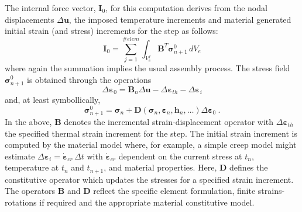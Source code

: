 \documentclass[11pt]{report}
\numberwithin{equation}{section}
\newcommand{\vepsilon}{\varepsilon}
\newcommand{\nid}{\noindent}
\begin{document}
The internal force vector, $\bm{I}_0$, for this computation derives from the 
nodal displacements $\Delta \bm{u}$, the imposed temperature increments and
material generated initial strain (and stress) increments for the step
as follows:
%
\begin{equation}\label{E:S3}
 \bm{I}_0 = \sum_{j=1}^{\#elem} \int_{V_e^j} \mathbf{B}^T \bm{\sigma}^{0}_{n+1}\, dV_e 
\end{equation}
%
\nid where again the summation implies the usual assembly process. The stress field $\bm{\sigma}^0_{n+1}$
is obtained through the operations
%
\begin{equation}\label{E:S4}
 \Delta \bm{\vepsilon}_0 = \mathbf {B}_n \Delta \bm{u} - \Delta \bm{\vepsilon}_{th} - \Delta \bm{\vepsilon}_{i}
\end{equation}
%
\noindent and, at least symbollically, 
%
\begin{equation}\label{E:S4a}
 \bm{\sigma}^0_{n+1} = \bm{\sigma}_n + 
 \mathbf{D}\left ( \bm{\sigma}_n, \bm{\vepsilon}_n, \bm{h}_n, \dots\right )\Delta  \bm{\vepsilon}_0 \ .
\end{equation}
%
\nid In the above, $\mathbf{B}$ denotes the incremental strain-displacement operator with 
$\Delta \bm{\varepsilon}_{th}$ the specified thermal strain increment for the step. 
The initial strain increment is computed by the material model where, for example,
a simple creep model might estimate $\Delta \bm{\vepsilon}_i= \bm{\dot \vepsilon}_{cr}\, \Delta t$
with $\bm{\dot \vepsilon}_{cr}$ dependent on the current stress at $t_n$, temperature at $t_n$ and
$t_{n+1}$, and material properties. 
Here, $\mathbf{D}$ defines 
the constitutive operator which updates the stresses for a specified strain increment. The operators $\mathbf{B}$
and $\mathbf{D}$  reflect the specific element formulation, finite strains-rotations if 
required and the appropriate material constitutive model.
\end{document}
